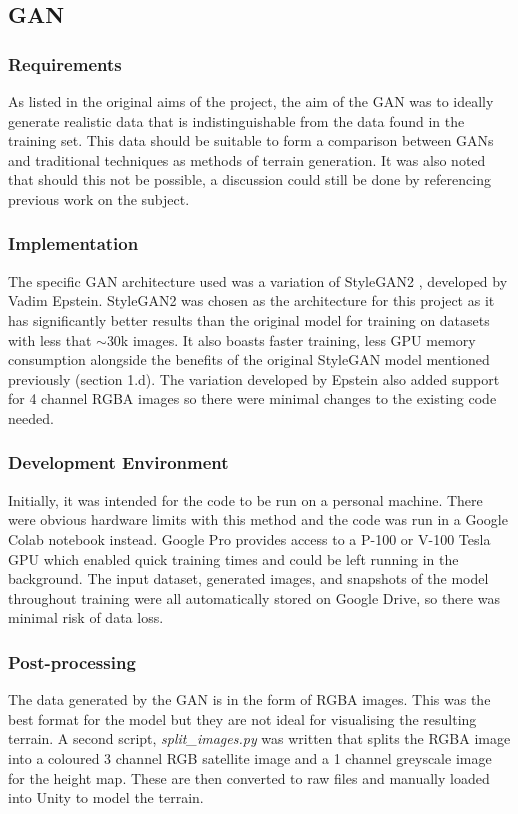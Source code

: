 \documentclass[a4paper]{report}
\begin{document}
\subsection{GAN}
\subsubsection{Requirements}
As listed in the original aims of the project, the aim of the GAN was to ideally generate realistic data that is indistinguishable from the data found in the training set. This data should be suitable to form a comparison between GANs and traditional techniques as methods of terrain generation. It was also noted that should this not be possible, a discussion could still be done by referencing previous work on the subject.

\subsubsection{Implementation}
The specific GAN architecture used was a variation of StyleGAN2 \cite{rgbasg}, developed by Vadim Epstein. StyleGAN2 was chosen as the architecture for this project as it has significantly better results than the original model for training on datasets with less that $\sim$30k images. It also boasts faster training, less GPU memory consumption alongside the benefits of the original StyleGAN model mentioned previously (section 1.d). The variation developed by Epstein also added support for 4 channel RGBA images so there were minimal changes to the existing code needed.

\subsubsection{Development Environment}
Initially, it was intended for the code to be run on a personal machine. There were obvious hardware limits with this method and the code was run in a Google Colab notebook instead. Google Pro provides access to a P-100 or V-100 Tesla GPU which enabled quick training times and could be left running in the background. The input dataset, generated images, and snapshots of the model throughout training were all automatically stored on Google Drive, so there was minimal risk of data loss.

\subsubsection{Post-processing}
The data generated by the GAN is in the form of RGBA images. This was the best format for the model but they are not ideal for visualising the resulting terrain. A second script, \textit{split\_images.py} was written that splits the RGBA image into a coloured 3 channel RGB satellite image and a 1 channel greyscale image for the height map. These are then converted to raw files and manually loaded into Unity to model the terrain.
\end{document}
